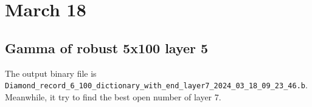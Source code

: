 \documentclass{llncs}
\begin{document}
\section{March 18}

\subsection*{Gamma of robust 5x100 layer 5}

The output binary file is \verb*|Diamond_record_6_100_dictionary_with_end_layer7_2024_03_18_09_23_46.b|. Meanwhile, it try to find the best open number of layer 7.
\end{document}
